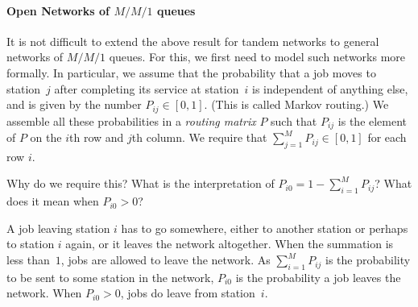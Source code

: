 \paragraph{Open Networks of $M/M/1$ queues}
It is not difficult to extend the above result for tandem networks to general networks  of $M/M/1$ queues.
For this, we first need to model such networks more formally.
In particular, we assume that the probability that a job moves to station~$j$ after completing its service at station~$i$ is independent of anything else, and is given by the number $P_{i j}\in[0,1]$.
(This is called Markov routing.)
We assemble all these probabilities in a \emph{routing matrix} $P$ such that $P_{i j}$ is the element of $P$ on the $i$th row and $j$th column.
We require that $\sum_{j=1}^M P_{i j} \in [0, 1]$ for each row $i$. 

\begin{exercise}
  Why do we require this?
  What is the interpretation of $P_{i 0} = 1-\sum_{i=1}^M P_{i j}$? What does it mean when $P_{i 0 } > 0$?
\begin{solution}
  A job leaving station $i$ has to go somewhere, either to another station or perhaps to station $i$ again, or it leaves the network altogether.
  When the summation is less than~$1$, jobs are allowed to leave the network.
  As $\sum_{i=1}^MP_{i j}$ is the probability to be sent to some station in the network, $P_{i 0} $ is the probability a job leaves the network.
  When $P_{i 0} > 0$, jobs do leave from station~$i$.
\end{solution}
\end{exercise}


